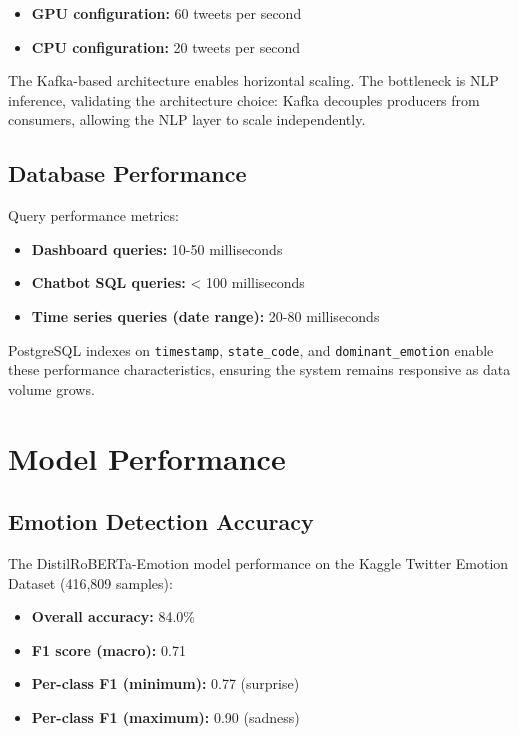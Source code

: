 \begin{itemize}
\item \textbf{GPU configuration:} 60 tweets per second
\item \textbf{CPU configuration:} 20 tweets per second
\end{itemize}

The Kafka-based architecture enables horizontal scaling. The bottleneck is NLP inference, validating the architecture choice: Kafka decouples producers from consumers, allowing the NLP layer to scale independently.

\subsection{Database Performance}

Query performance metrics:

\begin{itemize}
\item \textbf{Dashboard queries:} 10-50 milliseconds
\item \textbf{Chatbot SQL queries:} < 100 milliseconds
\item \textbf{Time series queries (date range):} 20-80 milliseconds
\end{itemize}

PostgreSQL indexes on \texttt{timestamp}, \texttt{state\_code}, and \texttt{dominant\_emotion} enable these performance characteristics, ensuring the system remains responsive as data volume grows.
 

\section{Model Performance}

\subsection{Emotion Detection Accuracy}

The DistilRoBERTa-Emotion model performance on the Kaggle Twitter Emotion Dataset (416,809 samples):

\begin{itemize}
\item \textbf{Overall accuracy:} 84.0\%
\item \textbf{F1 score (macro):} 0.71
\item \textbf{Per-class F1 (minimum):} 0.77 (surprise)
\item \textbf{Per-class F1 (maximum):} 0.90 (sadness)
\end{itemize}

